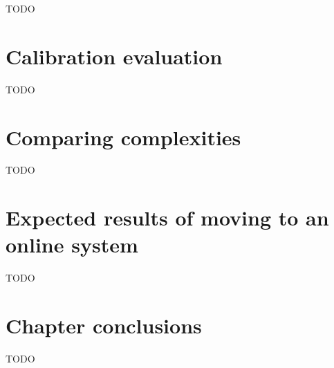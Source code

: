 TODO

\section{Calibration evaluation}
\label{sec:evaluation_calibration}


TODO

\section{Comparing complexities}
\label{sec:evaluation_complexities}

TODO

\section{Expected results of moving to an online system}
\label{sec:evaluation_online}


TODO

\section{Chapter conclusions}
\label{sec:evaluation_conclusions}

TODO
